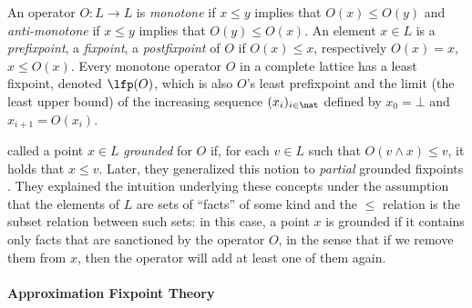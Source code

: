 An operator $O:L\to L$ is \emph{monotone} if $x\leq y$ implies that $O(x)\leq O(y)$ and \emph{anti-monotone} if $x\leq y$ implies that $O(y)\leq O(x)$. An element $x\in L$ is a \emph{prefixpoint}, a \emph{fixpoint}, a \emph{postfixpoint} of $O$ if $O(x)\leq x$, respectively $O(x)=x$, $x\leq O(x)$. 
Every monotone operator $O$ in a %
complete lattice has a least fixpoint, denoted $\lfp(O)$, which is also $O$'s least prefixpoint and the limit (the least upper bound) of the increasing sequence $(x_i)_{i \in \nat}$ defined by $x_0=\bot$ and $x_{i+1} = O(x_i)$. 


 called a point  $x\in L$ \emph{grounded} for $O$ if, for each $v\in L$ such that $O(v\land x)\leq v$, it holds that $x\leq v$. Later, they generalized this notion to \emph{partial} grounded fixpoints . 
They explained the intuition underlying these concepts under the assumption that the elements of $L$ are sets of ``facts'' of some kind and the $\leq$ relation is the subset relation between such sets:
in this case, a point $x$ is grounded if it contains only facts that are sanctioned by the operator $O$, 
in the sense that if we remove them from $x$, then the operator will add at least one of them again. 



\paragraph{Approximation Fixpoint Theory}


